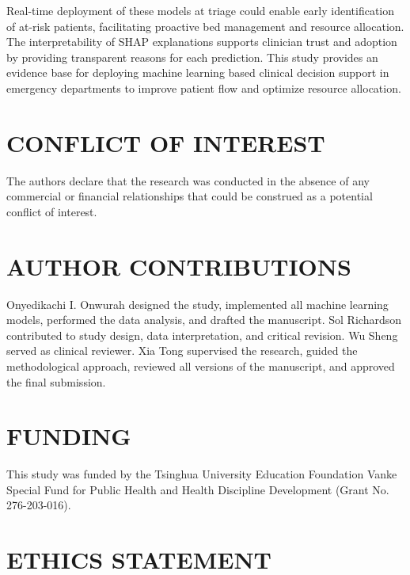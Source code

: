 \documentclass[harvard,article]{frontiersinFPHY_FAMS}
\begin{document}
Real-time deployment of these models at triage could enable early identification of at-risk patients, facilitating proactive bed management and resource allocation. The interpretability of SHAP explanations supports clinician trust and adoption by providing transparent reasons for each prediction. This study provides an evidence base for deploying machine learning based clinical decision support in emergency departments to improve patient flow and optimize resource allocation.

\section{CONFLICT OF INTEREST}

The authors declare that the research was conducted in the absence of any commercial or financial relationships that could be construed as a potential conflict of interest.

\section{AUTHOR CONTRIBUTIONS}

Onyedikachi I. Onwurah designed the study, implemented all machine learning models, performed the data analysis, and drafted the manuscript. Sol Richardson contributed to study design, data interpretation, and critical revision. Wu Sheng served as clinical reviewer. Xia Tong supervised the research, guided the methodological approach, reviewed all versions of the manuscript, and approved the final submission.
\section{FUNDING}


This study was funded by the Tsinghua University Education Foundation Vanke Special Fund for Public Health and Health Discipline Development (Grant No. 276-203-016).

\section{ETHICS STATEMENT}
\end{document}
